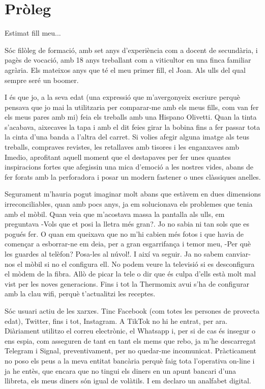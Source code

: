 \chapter{Pròleg}
Estimat fill meu...

Sóc filòleg de formació, amb set anys d'experiència com a docent de secundària, i pagès de vocació, amb 18 anys treballant com a viticultor en una finca familiar agrària. Els mateixos anys que té el meu primer fill, el Joan. Als ulls del qual sempre seré un boomer.

I és que jo, a la seva edat (una expressió que m'avergonyeix escriure perquè pensava que jo mai la utilitzaria per comparar-me amb els meus fills, com van fer els meus pares amb mi) feia els treballs amb una Hispano Olivetti. Quan la tinta s'acabava, aixecaves la tapa i amb el dit feies girar la bobina fins a fer passar tota la cinta d'una banda a l'altra del carret. Si volies afegir alguna imatge als teus treballs, compraves revistes, les retallaves amb tisores i les enganxaves amb Imedio, aprofitant aquell moment que el destapaves per fer unes quantes inspiracions fortes que afegissin una mica d'emoció a les nostres vides, abans de fer forats amb la perforadora i posar un modern fastener o unes clàssiques anelles.

Segurament m'hauria pogut imaginar molt abans que estàvem en dues dimensions irreconciliables, quan amb pocs anys, ja em solucionava els problemes que tenia amb el mòbil. Quan veia que m'acostava massa la pantalla als ulls, em preguntava -Vols que et posi la lletra més gran?. Jo no sabia ni tan sols que es pogués fer. O quan em queixava que no m'hi cabien més fotos i que havia de començar a esborrar-ne em deia, per a gran esgarrifança i temor meu, -Per què les guardes al telèfon? Posa-les al núvol!. I així va seguir. Ja no sabem canviar-nos el mòbil si no el configura ell. No podem veure la televisió si es desconfigura el mòdem de la fibra. Allò de picar la tele o dir que és culpa d'ells està molt mal vist per les noves generacions. Fins i tot la Thermomix avui s'ha de configurar amb la clau wifi, perquè t'actualitzi les receptes.

Sóc usuari actiu de les xarxes. Tinc Facebook (com totes les persones de provecta edat), Twitter, fins i tot, Instagram. A TikTok no hi he entrat, per ara. Diàriament utilitzo el correu electrònic, el Whatsapp i, per si de cas és insegur o ens espia, com asseguren de tant en tant els mems que rebo, ja m'he descarregat Telegram i Signal, preventivament, per no quedar-me incomunicat. Pràcticament no poso els peus a la meva entitat bancària perquè faig tota l'operativa on-line i ja he entès, que encara que no tingui els diners en un apunt bancari d'una llibreta, els meus diners són igual de volàtils. I em declaro un analfabet digital.

